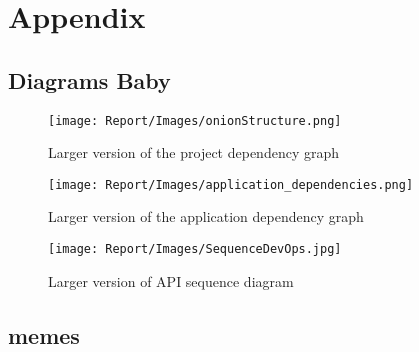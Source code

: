 \section{Appendix}
\subsection{Diagrams Baby}

\begin{figure}[H]
    \centering
    \texttt{[image: Report/Images/onionStructure.png]}
    \caption{Larger version of the project dependency graph}
    \label{fig:projectDependencyGraph}
\end{figure}
\begin{figure}[H]
    \centering
    \texttt{[image: Report/Images/application\_dependencies.png]}
    \caption{Larger version of the application dependency graph}
    \label{fig:ApplicationDependencyGraph}
\end{figure}

\begin{figure}[H]
    \centering
    \texttt{[image: Report/Images/SequenceDevOps.jpg]} 
    \caption{Larger version of API sequence diagram}
    \label{fig:Data Journey}
\end{figure}






\subsection{memes}



